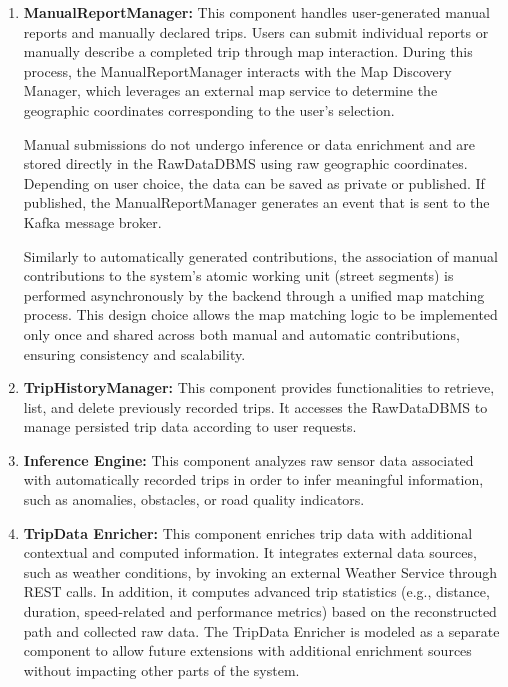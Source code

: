 \begin{enumerate}
    It is worth noting that, at this stage, contributions are still associated with raw geographic coordinates. The association of each contribution to a specific street segment—considered the atomic working unit of the system—is performed later through a map matching process. This operation relies on external map data providers (e.g., OpenStreetMap) and is handled asynchronously by the Data Aggregation Service during the aggregation phase.


    \item \textbf{ManualReportManager:}  
    This component handles user-generated manual reports and manually declared trips. Users can submit individual reports or manually describe a completed trip through map interaction. During this process, the ManualReportManager interacts with the Map Discovery Manager, which leverages an external map service to determine the geographic coordinates corresponding to the user’s selection.
    
    Manual submissions do not undergo inference or data enrichment and are stored directly in the RawDataDBMS using raw geographic coordinates. Depending on user choice, the data can be saved as private or published. If published, the ManualReportManager generates an event that is sent to the Kafka message broker.
    
    Similarly to automatically generated contributions, the association of manual contributions to the system’s atomic working unit (street segments) is performed asynchronously by the backend through a unified map matching process. This design choice allows the map matching logic to be implemented only once and shared across both manual and automatic contributions, ensuring consistency and scalability.


    \item \textbf{TripHistoryManager:}  
    This component provides functionalities to retrieve, list, and delete previously recorded trips. It accesses the RawDataDBMS to manage persisted trip data according to user requests.

    \item \textbf{Inference Engine:}  
    This component analyzes raw sensor data associated with automatically recorded trips in order to infer meaningful information, such as anomalies, obstacles, or road quality indicators. 

    \item \textbf{TripData Enricher:}  
    This component enriches trip data with additional contextual and computed information. It integrates external data sources, such as weather conditions, by invoking an external Weather Service through REST calls. In addition, it computes advanced trip statistics (e.g., distance, duration, speed-related and performance metrics) based on the reconstructed path and collected raw data.  
    The TripData Enricher is modeled as a separate component to allow future extensions with additional enrichment sources without impacting other parts of the system.


\end{enumerate}
